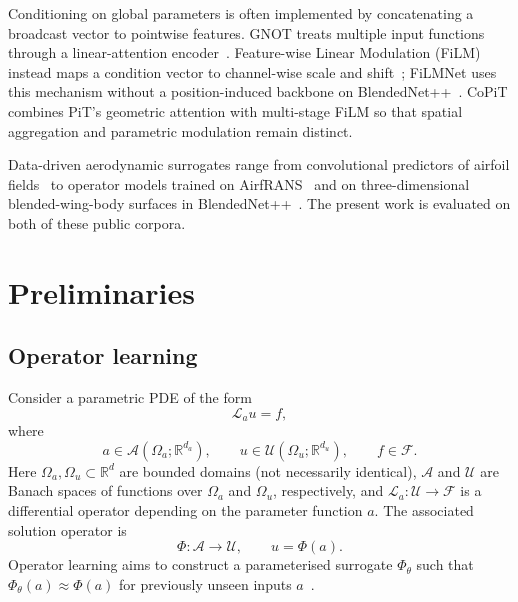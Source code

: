 \documentclass[final,3p,times]{elsarticle}
\begin{document}
Conditioning on global parameters is often implemented by concatenating a broadcast vector to pointwise features. GNOT treats multiple input functions through a linear-attention encoder~\cite{hao2023gnot}. Feature-wise Linear Modulation (FiLM) instead maps a condition vector to channel-wise scale and shift~\cite{perez2018film,dumoulin2018film_survey}; FiLMNet uses this mechanism without a position-induced backbone on BlendedNet++~\cite{sung2025blendednetpp}. CoPiT combines PiT's geometric attention with multi-stage FiLM so that spatial aggregation and parametric modulation remain distinct.

Data-driven aerodynamic surrogates range from convolutional predictors of airfoil fields~\cite{bhatnagar2019cnn_aero,thuerey2020deepcfd} to operator models trained on AirfRANS~\cite{bonnet2022airfrans} and on three-dimensional blended-wing-body surfaces in BlendedNet++~\cite{sung2025blendednetpp}. The present work is evaluated on both of these public corpora.

\section{Preliminaries}
\label{sec:prelim}
\subsection{Operator learning}
\label{sec:op_learn}
Consider a parametric PDE of the form
\begin{equation}
  \mathcal{L}_{a}u = f,
  \label{eq:pde}
\end{equation}
where
\begin{equation}
  a \in \mathcal{A}(\Omega_{a};\mathbb{R}^{d_{a}}),
  \qquad
  u \in \mathcal{U}(\Omega_{u};\mathbb{R}^{d_{u}}),
  \qquad
  f \in \mathcal{F}.
  \label{eq:spaces}
\end{equation}
Here $\Omega_{a},\Omega_{u}\subset\mathbb{R}^{d}$ are bounded domains (not necessarily identical), $\mathcal{A}$ and $\mathcal{U}$ are Banach spaces of functions over $\Omega_{a}$ and $\Omega_{u}$, respectively, and $\mathcal{L}_{a}:\mathcal{U}\to\mathcal{F}$ is a differential operator depending on the parameter function $a$. The associated solution operator is
\begin{equation}
  \Phi : \mathcal{A} \to \mathcal{U},
  \qquad
  u = \Phi(a).
  \label{eq:solution_op}
\end{equation}
Operator learning aims to construct a parameterised surrogate $\Phi_{\theta}$ such that $\Phi_{\theta}(a)\approx\Phi(a)$ for previously unseen inputs $a$~\cite{kovachki2023neural,li2021fno,chen2024pit}.
\end{document}
